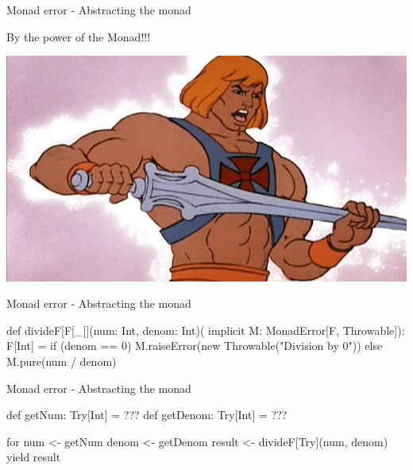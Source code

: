 \documentclass[13pt]{beamer}
\begin{document}
\begin{frame}{Monad error - Abstracting the monad}

  
  \begin{center}
    By the power of the Monad!!! \\
    \vline

    \includegraphics[scale=0.33]{figures/he-man.jpg}
  \end{center}

\end{frame}

\begin{frame}[fragile]{Monad error - Abstracting the monad}

  \begin{scalaCode}
    def divideF[F[_]](num: Int, denom: Int)(
        implicit M: MonadError[F, Throwable]): F[Int] = {
      if (denom == 0) M.raiseError(new Throwable("Division by 0"))
      else M.pure(num / denom)
    }
  \end{scalaCode}

\end{frame}

\begin{frame}[fragile]{Monad error - Abstracting the monad}

  \begin{scalaCode}
    def getNum: Try[Int] = ???
    def getDenom: Try[Int] = ???

    for {
      num <- getNum
      denom <- getDenom
      result <- divideF[Try](num, denom)
    } yield result
  \end{scalaCode}

\end{frame}
\end{document}
